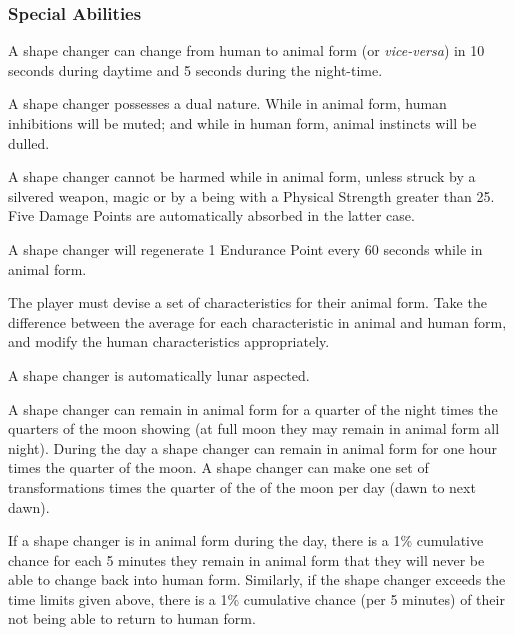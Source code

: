 \begin{multicols*}{3}
\subsubsection{Special Abilities}

\begin{Enumerate}
\item
A shape changer can change from human to animal form (or
\emph{vice-versa}) in 10 seconds during daytime and 5 seconds during
the night-time.

\item
A shape changer possesses a dual nature. While in animal form, human
inhibitions will be muted; and while in human form, animal instincts
will be dulled.

\item
A shape changer cannot be harmed while in animal form, unless struck
by a silvered weapon, magic or by a being with a Physical Strength
greater than 25. Five Damage Points are automatically absorbed in the
latter case.

\item
A shape changer will regenerate 1 Endurance Point every 60 seconds
while in animal form.

\item
The player must devise a set of characteristics for their animal
form. Take the difference between the average for each characteristic
in animal and human form, and modify the human characteristics
appropriately.

\item
A shape changer is automatically lunar aspected.

\item
A shape changer can remain in animal form for a quarter of the night
times the quarters of the moon showing (\ie at full moon they may
remain in animal form all night). During the day a shape changer can
remain in animal form for one hour times the quarter of the moon. A
shape changer can make one set of transformations times the quarter of
the of the moon per day (\ie dawn to next dawn).

\item
If a shape changer is in animal form during the day, there is a 1\%
cumulative chance for each 5 minutes they remain in animal form that
they will never be able to change back into human form. Similarly, if
the shape changer exceeds the time limits given above, there is a 1\%
cumulative chance (per 5 minutes) of their not being able to return to
human form.


\end{Enumerate}
\end{multicols*}
